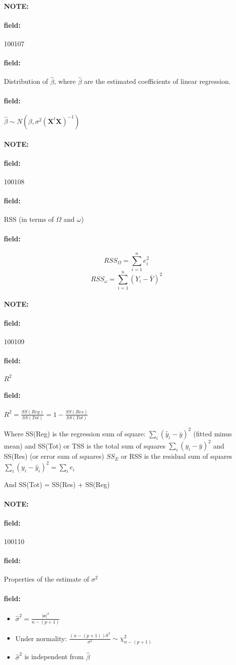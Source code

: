 \documentclass[12pt]{article}
\newenvironment{note}{\paragraph{NOTE:}}{}
\newenvironment{field}{\paragraph{field:}}{}
\begin{document}
\begin{note} \begin{field} \tiny 100107 \end{field}
 \begin{field}
  Distribution of $\hat{\beta}$, where $\hat{\beta}$ are the estimated coefficients of linear regression.
 \end{field}
 \begin{field}
  $\hat{\beta} \sim N(\beta, \sigma^2(\mathbf{X}^t \mathbf{X})^{-1})$
 \end{field}
\end{note}

\begin{note} \begin{field} \tiny 100108 \end{field}
 \begin{field}
  RSS (in terms of $\Omega$ and $\omega$)
 \end{field}
 \begin{field}
  $$RSS_\Omega = \sum_{i=1}^n e_i^2$$
  $$RSS_\omega = \sum_{i=1}^n (Y_i - \bar{Y})^2$$
 \end{field}
\end{note}


\begin{note} \begin{field} \tiny 100109 \end{field}
 \begin{field}
  $R^2$
 \end{field}
 \begin{field}
  $R^2 = \frac{SS(Reg)}{SS(Tot)} = 1 - \frac{SS(Res)}{SS(Tot)}$

  Where SS(Reg) is the regression sum of square: $\sum_{i} (\hat{y}_i - \bar{y})^2$ (fitted minus mean)
  and SS(Tot) or TSS is the total sum of squares $\sum_{i} (y_i - \bar{y})^2$
  and SS(Res) (or error sum of squares) $SS_E$ or RSS is the residual sum of squares $\sum_i (y_i - \hat{y}_i)^2 = \sum_{i} e_i$

  And SS(Tot) = SS(Res) + SS(Reg)
 \end{field}
\end{note}



\begin{note} \begin{field} \tiny 100110 \end{field}
 \begin{field}
  Properties of the estimate of $\sigma^2$
 \end{field}
 \begin{field}
  \begin{itemize}
   \item   $\hat{\sigma}^2 = \frac{|\mathbf{e}|^2}{n - (p+1)}$
   \item Under normality: $\frac{(n - (p+1))\hat{\sigma}^2}{\sigma^2} \sim \chi^2_{n - (p+1)}$
   \item $\hat{\sigma}^2$ is independent from $\hat{\beta}$
  \end{itemize}
 \end{field}
\end{note}
\end{document}
